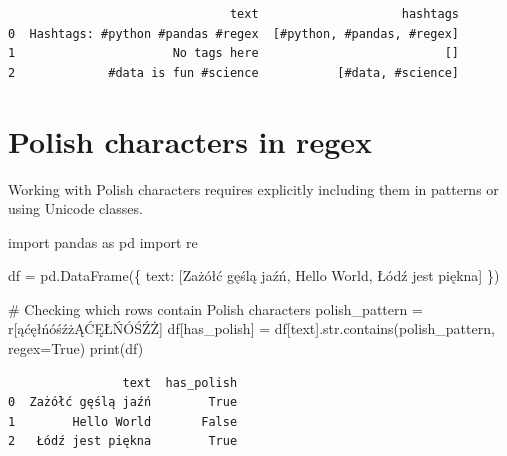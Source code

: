 \documentclass[
  english,
  letterpaper,
  DIV=11,
  numbers=noendperiod]{scrreprt}
\newenvironment{Shaded}{\begin{snugshade}}{\end{snugshade}}
\newcommand{\BuiltInTok}[1]{\textcolor[rgb]{0.00,0.23,0.31}{#1}}
\newcommand{\CommentTok}[1]{\textcolor[rgb]{0.37,0.37,0.37}{#1}}
\newcommand{\ImportTok}[1]{\textcolor[rgb]{0.00,0.46,0.62}{#1}}
\newcommand{\NormalTok}[1]{\textcolor[rgb]{0.00,0.23,0.31}{#1}}
\newcommand{\OperatorTok}[1]{\textcolor[rgb]{0.37,0.37,0.37}{#1}}
\newcommand{\PreprocessorTok}[1]{\textcolor[rgb]{0.68,0.00,0.00}{#1}}
\newcommand{\StringTok}[1]{\textcolor[rgb]{0.13,0.47,0.30}{#1}}
\newcommand{\VariableTok}[1]{\textcolor[rgb]{0.07,0.07,0.07}{#1}}
\newcommand{\VerbatimStringTok}[1]{\textcolor[rgb]{0.13,0.47,0.30}{#1}}
\begin{document}
\begin{verbatim}
                               text                    hashtags
0  Hashtags: #python #pandas #regex  [#python, #pandas, #regex]
1                      No tags here                          []
2             #data is fun #science           [#data, #science]
\end{verbatim}

\section{Polish characters in regex}\label{polish-characters-in-regex}

Working with Polish characters requires explicitly including them in
patterns or using Unicode classes.

\begin{Shaded}
\begin{Highlighting}[]
\ImportTok{import}\NormalTok{ pandas }\ImportTok{as}\NormalTok{ pd}
\ImportTok{import}\NormalTok{ re}

\NormalTok{df }\OperatorTok{=}\NormalTok{ pd.DataFrame(\{}
    \StringTok{\textquotesingle{}text\textquotesingle{}}\NormalTok{: [}\StringTok{\textquotesingle{}Zażółć gęślą jaźń\textquotesingle{}}\NormalTok{, }\StringTok{\textquotesingle{}Hello World\textquotesingle{}}\NormalTok{, }\StringTok{\textquotesingle{}Łódź jest piękna\textquotesingle{}}\NormalTok{]}
\NormalTok{\})}

\CommentTok{\# Checking which rows contain Polish characters}
\NormalTok{polish\_pattern }\OperatorTok{=} \VerbatimStringTok{r\textquotesingle{}}\PreprocessorTok{[ąćęłńóśźżĄĆĘŁŃÓŚŹŻ]}\VerbatimStringTok{\textquotesingle{}}
\NormalTok{df[}\StringTok{\textquotesingle{}has\_polish\textquotesingle{}}\NormalTok{] }\OperatorTok{=}\NormalTok{ df[}\StringTok{\textquotesingle{}text\textquotesingle{}}\NormalTok{].}\BuiltInTok{str}\NormalTok{.contains(polish\_pattern, regex}\OperatorTok{=}\VariableTok{True}\NormalTok{)}
\BuiltInTok{print}\NormalTok{(df)}
\end{Highlighting}
\end{Shaded}

\begin{verbatim}
                text  has_polish
0  Zażółć gęślą jaźń        True
1        Hello World       False
2   Łódź jest piękna        True
\end{verbatim}
\end{document}
